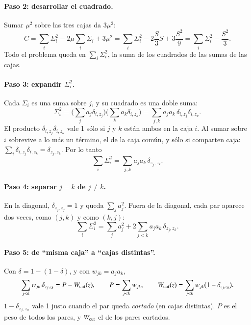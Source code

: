 \documentclass[11pt,a4paper]{article}
\begin{document}
\paragraph{Paso 2: desarrollar el cuadrado.} Sumar $\mu^2$ sobre las tres cajas da $3\mu^2$:
\begin{equation}
  C=\sum_i\Sigma_i^2-2\mu\sum_i\Sigma_i+3\mu^2
   =\sum_i\Sigma_i^2-2\frac S3S+3\frac{S^2}{9}
   =\sum_i\Sigma_i^2-\frac{S^2}{3}.
  \label{eq:paso2}
\end{equation}
Todo el problema queda en $\sum_i\Sigma_i^2$, la suma de los cuadrados de las sumas de las cajas.

\paragraph{Paso 3: expandir $\Sigma_i^2$.} Cada $\Sigma_i$ es una suma sobre $j$, y su cuadrado es
una doble suma:
\begin{equation}
  \Sigma_i^2=\Big(\sum_ja_j\delta_{i,z_j}\Big)\Big(\sum_ka_k\delta_{i,z_k}\Big)
  =\sum_{j,k}a_ja_k\,\delta_{i,z_j}\delta_{i,z_k}.
\end{equation}
El producto $\delta_{i,z_j}\delta_{i,z_k}$ vale 1 sólo si $j$ y $k$ están ambos en la caja $i$. Al
sumar sobre $i$ sobrevive a lo más un término, el de la caja común, y sólo si comparten caja:
$\sum_i\delta_{i,z_j}\delta_{i,z_k}=\delta_{z_j,z_k}$. Por lo tanto
\begin{equation}
  \sum_i\Sigma_i^2=\sum_{j,k}a_ja_k\,\delta_{z_j,z_k}.
\end{equation}

\paragraph{Paso 4: separar $j=k$ de $j\neq k$.} En la diagonal, $\delta_{z_j,z_j}=1$ y queda
$\sum_ja_j^2$. Fuera de la diagonal, cada par aparece dos veces, como $(j,k)$ y como $(k,j)$:
\begin{equation}
  \sum_i\Sigma_i^2=\sum_ja_j^2+2\sum_{j<k}a_ja_k\,\delta_{z_j,z_k}.
\end{equation}

\paragraph{Paso 5: de ``misma caja'' a ``cajas distintas''.} Con $\delta=1-(1-\delta)$, y con
$w_{jk}=a_ja_k$,
\begin{equation}
  \sum_{j<k}w_{jk}\,\delta_{z_j,z_k}=P-W_{\rm cut}(z),\qquad
  P=\sum_{j<k}w_{jk},\qquad
  W_{\rm cut}(z)=\sum_{j<k}w_{jk}\big(1-\delta_{z_j,z_k}\big).
\end{equation}
$1-\delta_{z_j,z_k}$ vale 1 justo cuando el par queda \emph{cortado} (en cajas distintas). $P$ es el
peso de todos los pares, y $W_{\rm cut}$ el de los pares cortados.
\end{document}
